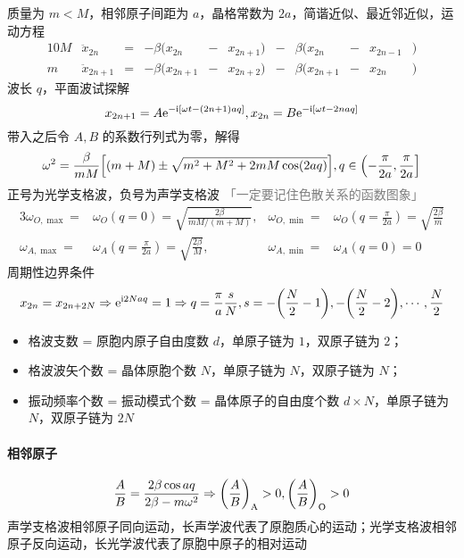 质量为 $m < M$，相邻原子间距为 $a$，晶格常数为 $2 a$，简谐近似、最近邻近似，运动方程
\begin{alignat*}{10}
    M & \ddot{x}_{2 n}     & = & - \beta (x_{2 n}     & - & x_{2 n + 1}) & - & \beta (x_{2 n}     & - & x_{2 n - 1} & ) \\
    m & \ddot{x}_{2 n + 1} & = & - \beta (x_{2 n + 1} & - & x_{2 n + 2}) & - & \beta (x_{2 n + 1} & - & x_{2 n}     & )
\end{alignat*}
波长 $q$，平面波试探解
\[ x_{2 n + 1} = A \mathrm{e}^{- \mathrm{i} [\omega t - (2 n + 1) a q]}, x_{2 n} = B \mathrm{e}^{- \mathrm{i} [\omega t - 2 n a q]} \]
带入之后令 ${A, B}$ 的系数行列式为零，解得
\[ \omega^2 = \frac{\beta}{m M} \qty[(m + M) \pm \sqrt{m^2 + M^2 + 2 m M \cos (2 a q)}], q \in \left(- \frac{\pi}{2 a}, \frac{\pi}{2 a}\right] \]
正号为光学支格波，负号为声学支格波 {\textcolor{gray}{「一定要记住色散关系的函数图象」}}
\begin{alignat*}{3}
    \omega_{O, \max} = & \omega_{O}(q = 0) = \sqrt{\frac{2 \beta}{m M / (m + M)}}    , & \omega_{O, \min} = & \omega_{O}(q = \frac{\pi}{2 a}) = \sqrt{\frac{2 \beta}{m}} \\
    \omega_{A, \max} = & \omega_{A}(q = \frac{\pi}{2 a}) = \sqrt{\frac{2 \beta}{M}}  , & \omega_{A, \min} = & \omega_{A}(q = 0) = 0
\end{alignat*}
周期性边界条件
\[ x_{2 n} = x_{2 n + 2 N} \Rightarrow \mathrm{e}^{\mathrm{i} 2 N a q} = 1 \Rightarrow q = \frac{\pi}{a} \frac{s}{N}, s = - \qty(\frac{N}{2} - 1), - \qty(\frac{N}{2} - 2), \cdots, \frac{N}{2} \]
\begin{itemize}
    \item 格波支数 = 原胞内原子自由度数 $d$，单原子链为 $1$，双原子链为 $2$；
    \item 格波波矢个数 = 晶体原胞个数 $N$，单原子链为 $N$，双原子链为 $N$；
    \item 振动频率个数 = 振动模式个数 = 晶体原子的自由度个数 $d \times N$，单原子链为 $N$，双原子链为 $2 N$
\end{itemize}

\paragraph{相邻原子}

\[ \frac{A}{B} = \frac{2 \beta \cos a q}{2 \beta - m \omega^2} \Rightarrow \qty(\frac{A}{B})_{\text{A}} > 0, \qty(\frac{A}{B})_{\text{O}} > 0 \]
声学支格波相邻原子同向运动，长声学波代表了原胞质心的运动；光学支格波相邻原子反向运动，长光学波代表了原胞中原子的相对运动

